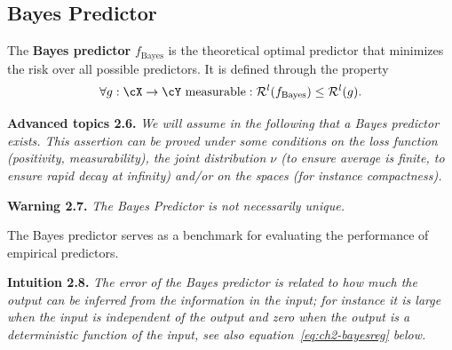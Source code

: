 \subsection{Bayes Predictor}
\label{sec:ch2-bayes}

The \textbf{Bayes predictor} $f_{\text{Bayes}}$ is the theoretical optimal predictor that minimizes
the risk over all possible predictors. It is defined through the property
\begin{equation}\label{eq:ch2-bayesdef}
\forall g : \cX \to \cY \text{ measurable} : \mathcal{R}^{l}(f_{\text{Bayes}}) \le \mathcal{R}^{l}(g).
\end{equation}

\begin{tcolorbox}[advancedbox]
\textbf{Advanced topics 2.6.} \textit{We will assume in the following that a Bayes
predictor exists. This assertion can be proved under some conditions on
the loss function (positivity, measurability), the joint distribution $\nu$ (to
ensure average is finite, to ensure rapid decay at infinity) and/or on the
spaces (for instance compactness).}
\end{tcolorbox}

\begin{tcolorbox}[warningbox]
\textbf{Warning 2.7.} \textit{The Bayes Predictor is not necessarily unique.}
\end{tcolorbox}

The Bayes predictor serves as a benchmark for evaluating the performance
of empirical predictors.

\begin{tcolorbox}[remarkbox]
\textbf{Intuition 2.8.} \textit{The error of the Bayes predictor is related to how much
the output can be inferred from the information in the input; for instance
it is large when the input is independent of the output and zero when the
output is a deterministic function of the input, see also equation~\eqref{eq:ch2-bayesreg}
below.}
\end{tcolorbox}

